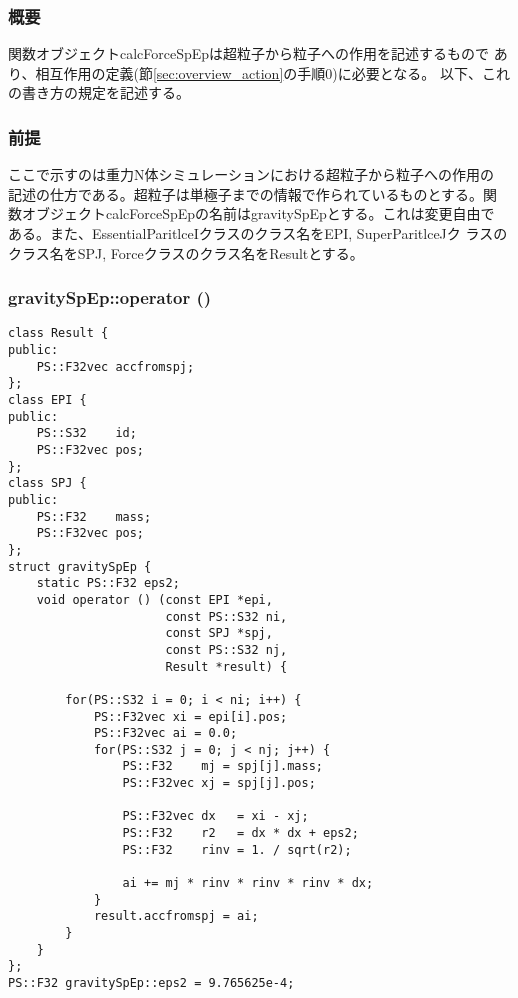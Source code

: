 \subsubsection{概要}

関数オブジェクトcalcForceSpEpは超粒子から粒子への作用を記述するもので
あり、相互作用の定義(節\ref{sec:overview_action}の手順0)に必要となる。
以下、これの書き方の規定を記述する。

\subsubsection{前提}

ここで示すのは重力N体シミュレーションにおける超粒子から粒子への作用の
記述の仕方である。超粒子は単極子までの情報で作られているものとする。関
数オブジェクトcalcForceSpEpの名前はgravitySpEpとする。これは変更自由で
ある。また、EssentialParitlceIクラスのクラス名をEPI, SuperParitlceJク
ラスのクラス名をSPJ, Forceクラスのクラス名をResultとする。

\subsubsection{gravitySpEp::operator ()}

\begin{lstlisting}[caption=calcForceSpEp]
class Result {
public:
    PS::F32vec accfromspj;
};
class EPI {
public:
    PS::S32    id;
    PS::F32vec pos;
};
class SPJ {
public:
    PS::F32    mass;
    PS::F32vec pos;
};
struct gravitySpEp {
    static PS::F32 eps2;
    void operator () (const EPI *epi,
                      const PS::S32 ni,
                      const SPJ *spj,
                      const PS::S32 nj,
                      Result *result) {
                      
        for(PS::S32 i = 0; i < ni; i++) {
            PS::F32vec xi = epi[i].pos;
            PS::F32vec ai = 0.0;
            for(PS::S32 j = 0; j < nj; j++) {
                PS::F32    mj = spj[j].mass;
                PS::F32vec xj = spj[j].pos;

                PS::F32vec dx   = xi - xj;
                PS::F32    r2   = dx * dx + eps2;
                PS::F32    rinv = 1. / sqrt(r2);

                ai += mj * rinv * rinv * rinv * dx;
            }
            result.accfromspj = ai;
        }
    }
};
PS::F32 gravitySpEp::eps2 = 9.765625e-4;
\end{lstlisting}

